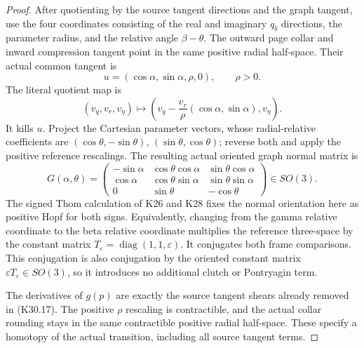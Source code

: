 \begin{proof}
After quotienting by the source tangent directions and
the graph tangent, use the four coordinates consisting of
the real and imaginary \(q_b\) directions, the parameter
radius, and the relative angle \(\beta-\theta\).
The outward page collar and inward compression tangent
point in the same positive radial half-space. Their actual
common tangent is
\[
           u=(\cos\alpha,\sin\alpha,\rho,0),\qquad\rho>0.
\]
The literal quotient map is
\[
 (v_q,v_r,v_\eta)\longmapsto
       \left(v_q-\frac{v_r}{\rho}(\cos\alpha,\sin\alpha),
               v_\eta\right).
 \tag{K30.17}
\]
It kills \(u\). Project the Cartesian parameter vectors,
whose radial-relative coefficients are
\((\cos\theta,-\sin\theta)\), \((\sin\theta,\cos\theta)\);
reverse both and apply the positive reference rescalings.
The resulting actual oriented graph normal matrix is
\[
 G(\alpha,\theta)=
 \begin{pmatrix}
 -\sin\alpha&\cos\theta\cos\alpha&\sin\theta\cos\alpha\\
 \cos\alpha&\cos\theta\sin\alpha&\sin\theta\sin\alpha\\
 0&\sin\theta&-\cos\theta
 \end{pmatrix}\in SO(3).
 \tag{K30.18}
\]
The signed Thom calculation of K26 and K28 fixes the normal
orientation here as positive Hopf for both signs.
Equivalently, changing from the gamma relative coordinate
to the beta relative coordinate multiplies the reference
three-space by the constant matrix
\(T_\varepsilon=\operatorname{diag}(1,1,\varepsilon)\).
It conjugates both frame comparisons. This conjugation is
also conjugation by the oriented constant matrix
\(\varepsilon T_\varepsilon\in SO(3)\), so it introduces no
additional clutch or Pontryagin term.

The derivatives of \(g(p)\) are exactly the source tangent
shears already removed in (K30.17). The positive \(\rho\)
rescaling is contractible, and the actual collar rounding
stays in the same contractible positive radial half-space.
These specify a homotopy of the actual transition, including
all source tangent terms.


\end{proof}
